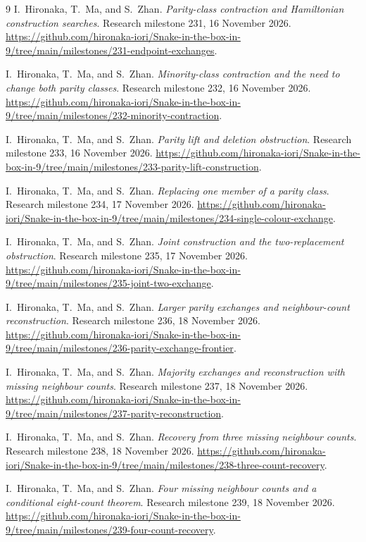 \documentclass[11pt,a4paper]{article}
\begin{document}
\begin{thebibliography}{9}
I.~Hironaka, T.~Ma, and S.~Zhan. \emph{Parity-class contraction and
Hamiltonian construction searches}. Research milestone 231,
16 November 2026.
\url{https://github.com/hironaka-iori/Snake-in-the-box-in-9/tree/main/milestones/231-endpoint-exchanges}.

I.~Hironaka, T.~Ma, and S.~Zhan. \emph{Minority-class contraction and
the need to change both parity classes}. Research milestone 232,
16 November 2026.
\url{https://github.com/hironaka-iori/Snake-in-the-box-in-9/tree/main/milestones/232-minority-contraction}.

I.~Hironaka, T.~Ma, and S.~Zhan. \emph{Parity lift and deletion obstruction}.
Research milestone 233, 16 November 2026.
\url{https://github.com/hironaka-iori/Snake-in-the-box-in-9/tree/main/milestones/233-parity-lift-construction}.

I.~Hironaka, T.~Ma, and S.~Zhan. \emph{Replacing one member of a parity class}.
Research milestone 234, 17 November 2026.
\url{https://github.com/hironaka-iori/Snake-in-the-box-in-9/tree/main/milestones/234-single-colour-exchange}.

I.~Hironaka, T.~Ma, and S.~Zhan. \emph{Joint construction and the
two-replacement obstruction}. Research milestone 235, 17 November 2026.
\url{https://github.com/hironaka-iori/Snake-in-the-box-in-9/tree/main/milestones/235-joint-two-exchange}.

I.~Hironaka, T.~Ma, and S.~Zhan. \emph{Larger parity exchanges and
neighbour-count reconstruction}. Research milestone 236, 18 November 2026.
\url{https://github.com/hironaka-iori/Snake-in-the-box-in-9/tree/main/milestones/236-parity-exchange-frontier}.

I.~Hironaka, T.~Ma, and S.~Zhan. \emph{Majority exchanges and reconstruction
with missing neighbour counts}. Research milestone 237, 18 November 2026.
\url{https://github.com/hironaka-iori/Snake-in-the-box-in-9/tree/main/milestones/237-parity-reconstruction}.

I.~Hironaka, T.~Ma, and S.~Zhan. \emph{Recovery from three missing neighbour
counts}. Research milestone 238, 18 November 2026.
\url{https://github.com/hironaka-iori/Snake-in-the-box-in-9/tree/main/milestones/238-three-count-recovery}.

I.~Hironaka, T.~Ma, and S.~Zhan. \emph{Four missing neighbour counts and a
conditional eight-count theorem}. Research milestone 239, 18 November 2026.
\url{https://github.com/hironaka-iori/Snake-in-the-box-in-9/tree/main/milestones/239-four-count-recovery}.


\end{thebibliography}
\end{document}
